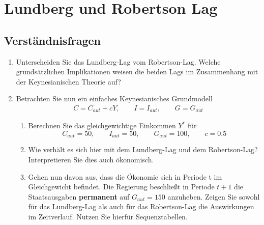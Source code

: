 \documentclass{scrartcl}
\begin{document}
\section{Lundberg und Robertson Lag}
\subsection{Verständnisfragen}
\begin{enumerate}
	\item Unterscheiden Sie das Lundberg-Lag vom Robertson-Lag. Welche grundsätzlichen Implikationen weisen die beiden Lags im Zusammenhang mit der Keynesianischen Theorie auf?
	\item Betrachten Sie nun ein einfaches Keynesianisches Grundmodell
	\begin{align*}
	C  = C_{aut} + c Y, \qquad I  = I_{aut}, \qquad G = G_{aut}
	\end{align*}
	\begin{enumerate}
		\item Berechnen Sie das gleichgewichtige Einkommen $Y^*$ für
		$$ C_{aut} = 50, \qquad I_{aut}=50, \qquad G_{aut}=100, \qquad c=0.5$$
		\item Wie verhält es sich hier mit dem Lundberg-Lag und dem Robertson-Lag? Interpretieren Sie dies auch ökonomisch.
		\item Gehen nun davon aus, dass die Ökonomie sich in Periode t im Gleichgewicht befindet. Die Regierung beschließt in Periode $t+1$ die Staatsausgaben \textbf{permanent} auf $G_{aut}=150$ anzuheben. Zeigen Sie sowohl für das Lundberg-Lag als auch für das Robertson-Lag die Auswirkungen im Zeitverlauf. Nutzen Sie hierfür Sequenztabellen.
	\end{enumerate}
\end{enumerate}
\end{document}
